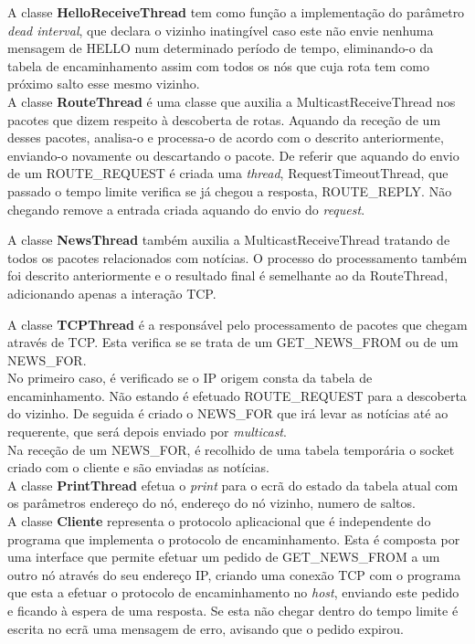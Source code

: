 \documentclass{llncs}
\begin{document}
A classe \textbf{HelloReceiveThread} tem como função a implementação do parâmetro \emph{dead interval}, que declara o vizinho inatingível caso este não envie nenhuma mensagem de HELLO num determinado período de tempo, eliminando-o da tabela de encaminhamento assim com todos os nós que cuja rota tem como próximo salto esse mesmo vizinho.
\\

A classe \textbf{RouteThread} é uma classe que auxilia a MulticastReceiveThread nos pacotes que dizem respeito à descoberta de rotas. Aquando da receção de um desses pacotes, analisa-o e processa-o de acordo com o descrito anteriormente, enviando-o novamente ou descartando o pacote.
De referir que aquando do envio de um ROUTE\_REQUEST é criada uma \emph{thread}, RequestTimeoutThread, que passado o tempo limite verifica se já chegou a resposta, ROUTE\_REPLY. Não chegando remove a entrada criada aquando do envio do \emph{request}.

A classe \textbf{NewsThread} também auxilia a MulticastReceiveThread tratando de todos os pacotes relacionados com notícias. O processo do processamento também foi descrito anteriormente e o resultado final é semelhante ao da RouteThread, adicionando apenas a interação TCP.

A classe \textbf{TCPThread} é a responsável pelo processamento de pacotes que chegam através de TCP. Esta verifica se se trata de um GET\_NEWS\_FROM ou de um NEWS\_FOR.\\
No primeiro caso, é verificado se o IP origem consta da tabela de encaminhamento. Não estando é efetuado ROUTE\_REQUEST para a descoberta do vizinho. De seguida é criado o NEWS\_FOR que irá levar as notícias até ao requerente, que será depois enviado por \emph{multicast}.\\
Na receção de um NEWS\_FOR, é recolhido de uma tabela temporária o socket criado com o cliente e são enviadas as notícias.\\

A classe \textbf{PrintThread} efetua o \emph{print} para o ecrã do estado da tabela atual com os parâmetros endereço do nó, endereço do nó vizinho, numero de saltos.
\\

A classe \textbf{Cliente} representa o protocolo aplicacional que é independente do programa que implementa o protocolo de encaminhamento. Esta é composta por uma interface que permite efetuar um pedido de GET\_NEWS\_FROM a um outro nó através do seu endereço IP, criando uma conexão TCP com o programa que esta a efetuar o protocolo de encaminhamento no \emph{host}, enviando este pedido e ficando à espera de uma resposta. Se esta não chegar dentro do tempo limite é escrita no ecrã uma mensagem de erro, avisando que o pedido expirou.
\end{document}
